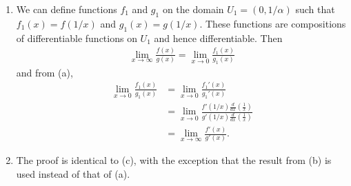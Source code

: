 \documentclass[a4paper,12pt]{article}
\begin{document}
\begin{enumerate}
\begin{enumerate}
                \item
                    We can define functions $f_1$ and $g_1$ on the domain $U_1 = (0, 1 / \alpha)$ such that $f_1(x) = f(1 / x)$ and $g_1(x) = g(1 / x)$. These functions are compositions of differentiable functions on $U_1$ and hence differentiable. Then
                    \begin{align*}
                        \lim_{x \to \infty} \frac{f(x)}{g(x)} = \lim_{x \to 0} \frac{f_1(x)}{g_1(x)}
                    \end{align*}
                    and from (a),
                    \begin{align*}
                        \lim_{x \to 0} \frac{f_1(x)}{g_1(x)} &= \lim_{x \to 0} \frac{f_1'(x)}{g_1'(x)} \\
                        &= \lim_{x \to 0} \frac{f'(1/x) \frac{d}{dx} \left( \frac{1}{x} \right)}{g'(1/x) \frac{d}{dx} \left( \frac{1}{x} \right)} \\
                        &= \lim_{x \to \infty} \frac{f'(x)}{g'(x)}.
                    \end{align*}

                \item
                    The proof is identical to (c), with the exception that the result from (b) is used instead of that of (a).
            \end{enumerate}
    \end{enumerate}
\end{document}

